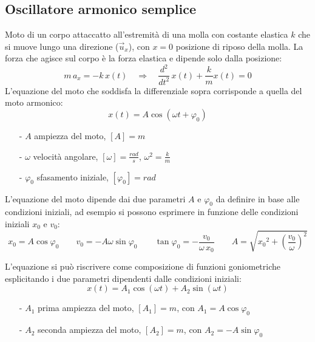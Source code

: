 \documentclass[a4paper]{article}
\newcommand\ux{\vec{u}_x}
\newcommand\dts{\frac{d^2}{dt^2}\,}
\begin{document}
\subsection{Oscillatore armonico semplice}
Moto di un corpo attaccatto all'estremità di una molla con costante elastica \(k\) che si muove lungo una direzione (\(\ux\)),
con \(x=0\) posizione di riposo della molla. La forza che agisce sul corpo è la forza elastica e dipende solo dalla posizione:
\[m \, a_x = -k \, x(t) \quad \Rightarrow \quad \dts x(t) + \frac{k}{m} x(t) = 0\]
L'equazione del moto che soddisfa la differenziale sopra corrisponde a quella del moto armonico:
\[x(t) = A \cos (\omega t + \varphi_0)\]
\begin{itemize}[topsep=3pt, itemsep=0pt]
	\item[-] \(A\) ampiezza del moto, \(\left[A\right] = m\)
	\item[-] \(\omega\) velocità angolare, \(\left[\omega\right] = \frac{rad}{s}\), \(\omega^2 = \frac{k}{m}\)
	\item[-] \(\varphi_0\) sfasamento iniziale, \(\left[\varphi_0\right] = rad\)
\end{itemize}

L'equazione del moto dipende dai due parametri \(A\) e \(\varphi_0\) da definire in base alle condizioni iniziali, ad esempio
si possono esprimere in funzione delle condizioni iniziali \(x_0\) e \(v_0\):
\[x_0 = A \cos \varphi_0 \qquad v_0 = -A \omega \sin \varphi_0 \qquad \tan \varphi_0 = -\frac{v_0}{\omega \, x_0} \qquad A = \sqrt{{x_0}^2 + \left(\frac{v_0}{\omega}\right)^2}\]

L'equazione si può riscrivere come composizione di funzioni goniometriche esplicitando i due parametri dipendenti dalle condizioni iniziali:
\[x(t) = A_1 \cos (\omega t) + A_2 \sin (\omega t)\]
\begin{itemize}[topsep=3pt, itemsep=0pt]
	\item[-] \(A_1\) prima ampiezza del moto, \(\left[A_1\right] = m\), con \(A_1 = A \cos \varphi_0\)
	\item[-] \(A_2\) seconda ampiezza del moto, \(\left[A_2\right] = m\), con \(A_2 = -A \sin \varphi_0\)
\end{itemize}
\end{document}
